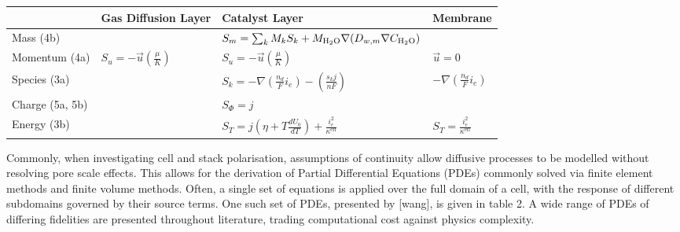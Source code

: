 \begin{minipage}[t]{\linewidth}
	\begin{center}
		\begin{tabularx}{\linewidth}{V Z Y Z}
			\toprule
			                & Gas Diffusion Layer             & Catalyst Layer                                                                      & Membrane                                  \\
			\midrule
			Mass (4b)       &                                 & $S_m = \sum_k M_k S_k + M_{\text{H}_2\text{O}} \nabla (D_{w,m} \nabla C_{\text{H}_2\text{O}})$              &                                           \\
			Momentum (4a)   & $S_u = -\vec{u}(\frac{\mu}{K})$ & $S_u = -\vec{u}(\frac{\mu}{K})$                                                     & $\vec{u} = 0$                             \\
			Species (3a)    &                                 & $S_k = -\nabla\left( \frac{n_d}{F} i_e\right) - \left( \frac{s_k j}{nF}\right)$     & $-\nabla\left( \frac{n_d}{F} i_e\right)$  \\
			Charge (5a, 5b) &                                 & $S_\Phi = j$                                                                        &                                           \\
			Energy (3b)     &                                 & $S_T = j\left( \eta + T \frac{dU_0}{dT}\right) + \frac{i_e^2}{\kappa^{\text{eff}}}$ & $S_T = \frac{i_e^2}{\kappa^{\text{eff}}}$ \\
			\bottomrule
		\end{tabularx}
	\end{center}
\end{minipage}

Commonly, when investigating cell and stack polarisation, assumptions of continuity allow diffusive processes to be modelled without resolving pore scale effects. This allows for the derivation of Partial Differential Equations (PDEs) commonly solved via finite element methods and finite volume methods. Often, a single set of equations is applied over the full domain of a cell, with the response of different subdomains governed by their source terms. One such set of PDEs, presented by [wang], is given in table 2. A wide range of PDEs of differing fidelities are presented throughout literature, trading computational cost against physics complexity.

